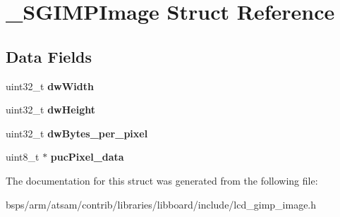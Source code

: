 \hypertarget{struct__SGIMPImage}{}\section{\+\_\+\+S\+G\+I\+M\+P\+Image Struct Reference}
\label{struct__SGIMPImage}
\subsection*{Data Fields}
\begin{DoxyCompactItemize}
\item 
\mbox{\label{struct__SGIMPImage_a776728d29e26ebc1b98601afd5059189}} 
uint32\+\_\+t {\bfseries dw\+Width}
\item 
\mbox{\label{struct__SGIMPImage_a4719e9ee5098f4ea10b0a21dfeeef679}} 
uint32\+\_\+t {\bfseries dw\+Height}
\item 
\mbox{\label{struct__SGIMPImage_adf89bb5829acb41ccc11e0424dee5fde}} 
uint32\+\_\+t {\bfseries dw\+Bytes\+\_\+per\+\_\+pixel}
\item 
\mbox{\label{struct__SGIMPImage_abd65205daa23bfbb146b738c72092e46}} 
uint8\+\_\+t $\ast$ {\bfseries puc\+Pixel\+\_\+data}
\end{DoxyCompactItemize}


The documentation for this struct was generated from the following file\+:\begin{DoxyCompactItemize}
\item 
bsps/arm/atsam/contrib/libraries/libboard/include/lcd\+\_\+gimp\+\_\+image.\+h\end{DoxyCompactItemize}
